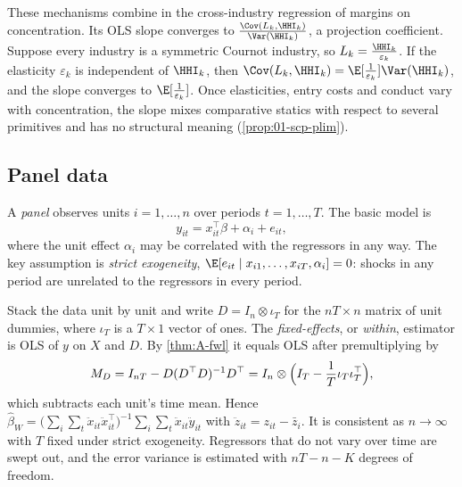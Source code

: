 These mechanisms combine in the cross-industry regression of margins on concentration. Its OLS slope
converges to $\frac{\Cov(L_k, \HHI_k)}{\Var(\HHI_k)}$, a projection coefficient. Suppose every industry is a
symmetric Cournot industry, so $L_k = \frac{\HHI_k}{\varepsilon_k}$. If the elasticity $\varepsilon_k$ is
independent of $\HHI_k$, then $\Cov(L_k, \HHI_k) = \E[\frac{1}{\varepsilon_k}]\Var(\HHI_k)$, and the slope
converges to $\E[\frac{1}{\varepsilon_k}]$. Once elasticities, entry costs and conduct vary with
concentration, the slope mixes comparative statics with respect to several primitives and has no structural
meaning (\cref{prop:01-scp-plim}).

\subsection{Panel data}\label{sec:A-panel}

A \emph{panel} observes units $i = 1, \dots, n$ over periods $t = 1, \dots, T$. The basic model is
\begin{equation}\label{eq:A-panel}
y_{it} = x_{it}^\top\beta + \alpha_i + e_{it} ,
\end{equation}
where the unit effect $\alpha_i$ may be correlated with the regressors in any way. The key assumption is
\emph{strict exogeneity}, $\E[e_{it} \mid x_{i1}, \dots, x_{iT}, \alpha_i] = 0$: shocks in any period are
unrelated to the regressors in every period.

Stack the data unit by unit and write $D = I_n \otimes \iota_T$ for the $nT \times n$ matrix of unit dummies,
where $\iota_T$ is a $T \times 1$ vector of ones. The \emph{fixed-effects}, or \emph{within}, estimator is OLS
of $y$ on $X$ and $D$. By \cref{thm:A-fwl} it equals OLS after premultiplying by
\begin{equation*}
M_D = I_{nT} - D(D^\top D)^{-1}D^\top = I_n \otimes \Bigl(I_T - \frac{1}{T}\iota_T\iota_T^\top\Bigr) ,
\end{equation*}
which subtracts each unit's time mean. Hence $\hat\beta_W = \bigl(\sum_i\sum_t\ddot x_{it}\ddot x_{it}^\top\bigr)^{-1}
\sum_i\sum_t\ddot x_{it}\ddot y_{it}$ with $\ddot z_{it} = z_{it} - \bar z_i$. It is consistent as $n \to \infty$
with $T$ fixed under strict exogeneity. Regressors that do not vary over time are swept out, and the error
variance is estimated with $nT - n - K$ degrees of freedom.

